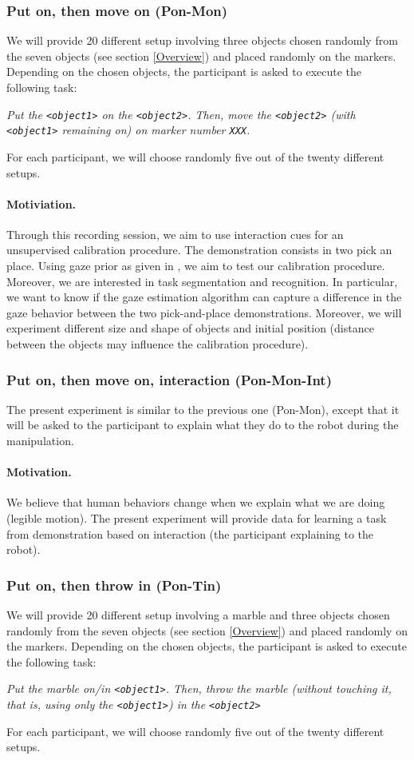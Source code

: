 \documentclass[11pt,a4paper]{article}
\begin{document}
\subsubsection{Put on, then move on (Pon-Mon)}
We will provide 20 different setup involving three objects chosen randomly from the seven objects (see section \ref{Overview}) and placed randomly on the markers. Depending on the chosen objects, the participant is asked to execute the following task:
\begin{center}
\textit{Put the \texttt{<object1>} on the \texttt{<object2>}. Then, move the \texttt{<object2>} (with \texttt{<object1>} remaining on) on marker number \texttt{XXX}.}
\end{center}
For each participant, we will choose randomly five out of the twenty different setups.
\paragraph{Motiviation.} Through this recording session, we aim to use interaction cues for an unsupervised calibration procedure. The demonstration consists in two pick an place. Using gaze prior as given in \cite{Land2009}, we aim to test our calibration procedure. Moreover, we are interested in task segmentation and recognition. In particular, we want to know if the gaze estimation algorithm can capture a difference in the gaze behavior between the two pick-and-place demonstrations. Moreover, we will experiment different size and shape of objects and initial position (distance between the objects may influence the calibration procedure).

\subsubsection{Put on, then move on, interaction (Pon-Mon-Int)}
The present experiment is similar to the previous one (Pon-Mon), except that it will be asked to the participant to explain what they do to the robot during the manipulation.
\paragraph{Motivation.}
We believe that human behaviors change when we explain what we are doing (legible motion). The present experiment will provide data for learning a task from demonstration based on interaction (the participant explaining to the robot).

\subsubsection{Put on, then throw in (Pon-Tin)}
We will provide 20 different setup involving a marble and three objects chosen randomly from the seven objects (see section \ref{Overview}) and placed randomly on the markers. Depending on the chosen objects, the participant is asked to execute the following task:
\begin{center}
\textit{Put the marble on/in \texttt{<object1>}. Then, throw the marble (without touching it, that is, using only the \texttt{<object1>}) in the \texttt{<object2>}}
\end{center}
For each participant, we will choose randomly five out of the twenty different setups.
\end{document}
